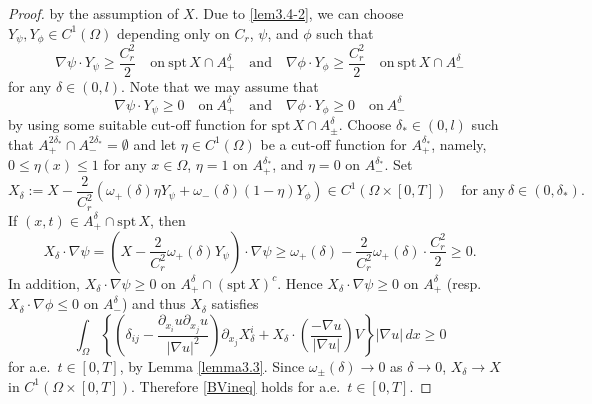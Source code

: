\documentclass[10pt,a4paper]{amsart}
\newcommand{\spt}{\mathrm{spt}\,}
\begin{document}
\begin{proof}
by the assumption of $X$. 
Due to \eqref{lem3.4-2}, we can choose $Y_\psi, Y_\phi \in C^1 (\Omega)$
depending only on $C_r$, $\psi$, and $\phi$ such that
\begin{equation}
\nabla \psi \cdot Y_\psi \geq \frac{C_r ^2}{2} \quad \text{on} \ \spt X \cap A_+ ^\delta 
\quad \text{and} \quad
\nabla \phi \cdot Y_\phi \geq \frac{C_r ^2}{2} \quad \text{on} \ \spt X \cap A_- ^\delta
\end{equation}
for any $\delta \in (0,l)$. 
Note that we may assume that
\[
\nabla \psi \cdot Y_\psi \geq 0 \quad \text{on} \ A_+ ^\delta 
\quad \text{and} \quad
\nabla \phi \cdot Y_\phi \geq 0 \quad \text{on} \ A_- ^\delta
\]
by using some suitable cut-off function for $\spt X \cap A_\pm ^\delta$.
Choose $\delta_\ast \in (0,l)$ such that $A_+ ^{2\delta_\ast} \cap A_- ^{2\delta_\ast} =\emptyset$ and let $\eta \in C^1 (\Omega)$ be a cut-off function for $A_+ ^{\delta_\ast}$, namely,
$0\leq \eta (x)\leq 1$ for any $x\in \Omega$,
$\eta =1$ on $A_+ ^{\delta_\ast}$, and $\eta =0$ on $A_- ^{\delta _\ast}$.
Set
\[
X_\delta := X - \frac{2}{C_r ^2} (\omega_+ (\delta) \eta Y_\psi 
+ \omega _- (\delta) (1-\eta) Y_\phi) \in C^1 (\Omega \times [0,T]) \quad \text{for any} \ \delta \in (0,\delta_\ast).
\]
If $(x,t) \in A_+ ^\delta \cap \spt X$, then 
\[
X_\delta \cdot \nabla \psi 
=
\left( X - \frac{2}{C_r ^2} \omega_+ (\delta) Y_\psi \right) \cdot \nabla \psi
\geq 
\omega_+ (\delta) - \frac{2}{C_r ^2} \omega_+ (\delta) \cdot \frac{C_r ^2}{2}\geq 0.
\]
In addition, $X_\delta \cdot \nabla \psi \geq 0$ on $A_+ ^\delta \cap (\spt X)^c$. Hence
$X_\delta \cdot \nabla \psi \geq 0$ on $A_+ ^\delta$ 
(resp. $X_\delta \cdot \nabla \phi \leq 0$ on $A_- ^\delta$)
and thus $X_\delta$ satisfies 
\begin{equation*}
\int_{\Omega} \left\{ 
\left( \delta_{ij} - \frac{ \partial_{x_i} u \partial _{x_j} u }{|\nabla u|^2} \right)
\partial_{x_j} X_\delta ^i 
+
X_\delta \cdot \left(\frac{-\nabla u}{|\nabla u|}\right) V 
\right\}
|\nabla u| \, dx \geq 0
\end{equation*}
for a.e.\ $t \in [0,T]$, by Lemma \ref{lemma3.3}. Since $\omega _\pm (\delta)\to 0$ as 
$\delta \to 0$, $X_\delta \to X$ in $C^1 (\Omega \times [0,T])$. 
Therefore \eqref{BVineq} holds 
for a.e.\ $t \in [0,T]$.


\end{proof}
\end{document}
